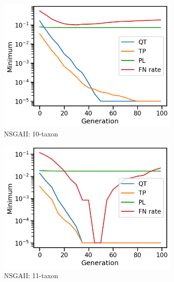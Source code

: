 \begin{figure}[!h]
	\centering
		\begin{subfigure}[b]{0.3\textwidth}
			\includegraphics[width=\textwidth]{Figure/10-taxon_NSGAII_minimum}
			\caption{NSGAII: 10-taxon}
		\end{subfigure}%
		\begin{subfigure}[b]{0.3\textwidth}
			\includegraphics[width=\textwidth]{Figure/11-taxon_NSGAII_minimum}
			\caption{NSGAII: 11-taxon}
		\end{subfigure}%
		\begin{subfigure}[b]{0.3\textwidth}

\end{subfigure}
\end{figure}
